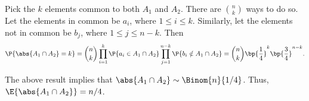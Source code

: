 \begin{solution}
\begin{ppart}
\begin{psubpart}
            Pick the $k$ elements common to both $A_1$ and $A_2$. There are $\binom{n}{k}$ ways to do so. Let the elements in common be $a_i$, where $1 \leq i \leq k$. Similarly, let the elements not in common be $b_j$, where $1 \leq j \leq n-k$. Then \[\P{\abs{A_1 \cap A_2} = k} = \binom{n}{k} \prod_{i = 1}^k \P{a_i \in A_1 \cap A_2} \prod_{j = 1}^{n-k} \P{b_i \notin A_1 \cap A_2} = \binom{n}{k} \bp{\frac14}^k \bp{\frac34}^{n-k}.\]
        \end{psubpart}
        \begin{psubpart}
            The above result implies that $\abs{A_1 \cap A_2} \sim \Binom{n}{1/4}$. Thus, $\E{\abs{A_1 \cap A_2}} = n/4$.
        \end{psubpart}
    \end{ppart}
\end{solution}

